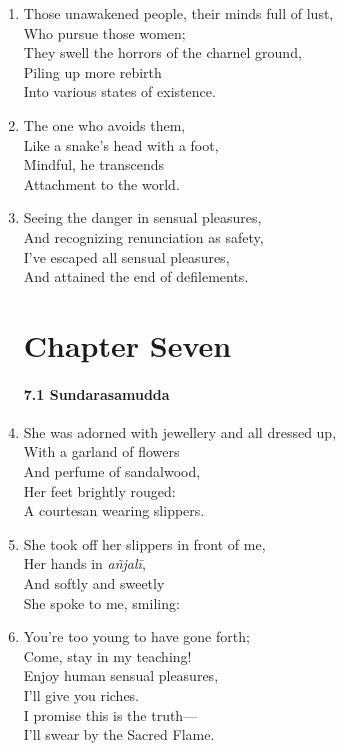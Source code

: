 \documentclass[10pt, openany]{book}
\newcommand*{\vleftofline}[1]{\leavevmode\llap{#1}}
\begin{document}
\begin{enumerate}
\item Those unawakened people, their minds full of lust,\\
Who pursue those women;\\
They swell the horrors of the charnel ground,\\
Piling up more rebirth \\
Into various states of existence.

\item The one who avoids them,\\
Like a snake’s head with a foot,\\
Mindful, he transcends\\
Attachment to the world.

\item Seeing the danger in sensual pleasures,\\
And recognizing renunciation as safety,\\
I’ve escaped all sensual pleasures,\\
And attained the end of defilements.

\chapter*{Chapter Seven}

\subsubsection*{7.1 Sundarasamudda}

\item She was adorned with jewellery and all dressed up,\\
With a garland of flowers \\
And perfume of sandalwood,\\
Her feet brightly rouged:\\
A courtesan wearing slippers.

\item She took off her slippers in front of me,\\
Her hands in \emph{añjalī},\\
And softly and sweetly\\
She spoke to me, smiling:

\item \vleftofline{“}You’re too young to have gone forth;\\
Come, stay in my teaching!\\
Enjoy human sensual pleasures,\\
I’ll give you riches.\\
I promise this is the truth—\\
I’ll swear by the Sacred Flame.


\end{enumerate}
\end{document}
